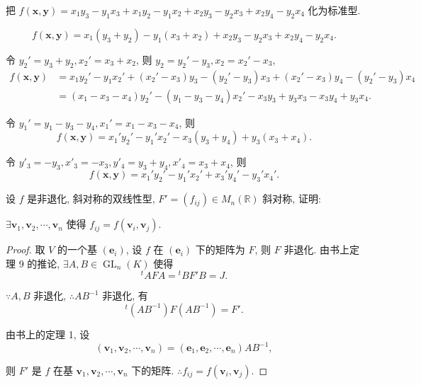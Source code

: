 \documentclass{ctexart}
\begin{document}
\begin{exercisec}%
    把 $f(\boldsymbol{x},\boldsymbol{y})=x_1y_3-y_1x_3+x_1y_2-y_1x_2+x_2y_3-y_2x_3+x_2y_4-y_2x_4$ 化为标准型.
\end{exercisec}
\begin{solution}
    \[f(\boldsymbol{x},\boldsymbol{y})=x_1(y_3+y_2)-y_1(x_3+x_2)+x_2y_3-y_2x_3+x_2y_4-y_2x_4.\]

    令 $y_2'=y_3+y_2,x_2'=x_3+x_2$, 则 $y_2=y_2'-y_3,x_2=x_2'-x_3$,
    \begin{align*}
        f(\boldsymbol{x},\boldsymbol{y}) & =x_1y_2'-y_1x_2'+(x_2'-x_3)y_3-(y_2'-y_3)x_3+(x_2'-x_3)y_4-(y_2'-y_3)x_4 \\
        & =(x_1-x_3-x_4)y_2'-(y_1-y_3-y_4)x_2'-x_3y_3+y_3x_3-x_3y_4+y_3x_4.
    \end{align*}

    令 $y_1'=y_1-y_3-y_4,x_1'=x_1-x_3-x_4$, 则
    \[f(\boldsymbol{x},\boldsymbol{y})=x_1'y_2'-y_1'x_2'-x_3(y_3+y_4)+y_3(x_3+x_4).\]

    令 $y'_3=-y_3,x'_3=-x_3,y'_4=y_3+y_4,x'_4=x_3+x_4$, 则
    \[f(\boldsymbol{x},\boldsymbol{y})=x_1'y_2'-y_1'x_2'+x_3'y_4'-y_3'x_4'.\]
\end{solution}
\begin{exercisec}%
    设 $f$ 是非退化, 斜对称的双线性型, $F'=(f_{ij})\in M_n(\mathbb{R})$ 斜对称, 证明:
    
    $\exists\boldsymbol{v}_1,\boldsymbol{v}_2,\cdots,\boldsymbol{v}_n$ 使得 $f_{ij}=f(\boldsymbol{v}_i,\boldsymbol{v}_j)$.
\end{exercisec}
\begin{proof}
    取 $V$ 的一个基 $(\boldsymbol{e}_i)$, 设 $f$ 在 $(\boldsymbol{e}_i)$ 下的矩阵为 $F$, 则 $F$ 非退化. 由书上定理 9 的推论, $\exists A,B\in\operatorname{GL}_n(K)$ 使得
    \[{}^tAFA={}^tBF'B=J.\]

    $\because A,B$ 非退化, $\therefore AB^{-1}$ 非退化, 有
    \[{}^t(AB^{-1})F(AB^{-1})=F'.\]

    由书上的定理 1, 设
    \[(\boldsymbol{v}_1,\boldsymbol{v}_2,\cdots,\boldsymbol{v}_n)=(\boldsymbol{e}_1,\boldsymbol{e}_2,\cdots,\boldsymbol{e}_n)AB^{-1},\]

    则 $F'$ 是 $f$ 在基 $\boldsymbol{v}_1,\boldsymbol{v}_2,\cdots,\boldsymbol{v}_n$ 下的矩阵. $\therefore f_{ij}=f(\boldsymbol{v}_i,\boldsymbol{v}_j)$.
\end{proof}
\end{document}
